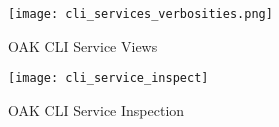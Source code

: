 \begin{figure}[p]
    \centering
    \texttt{[image: cli\_services\_verbosities.png]}
    \caption{OAK CLI Service Views}
    \label{fig:cli_service_views}
\end{figure}

\begin{figure}[p]
    \begin{adjustwidth}{-0.1\paperwidth}{-0.1\paperwidth}
        \centering
        \texttt{[image: cli\_service\_inspect]}
        \caption{OAK CLI Service Inspection}
        \label{fig:cli_service_inspection}
    \end{adjustwidth}
\end{figure}
